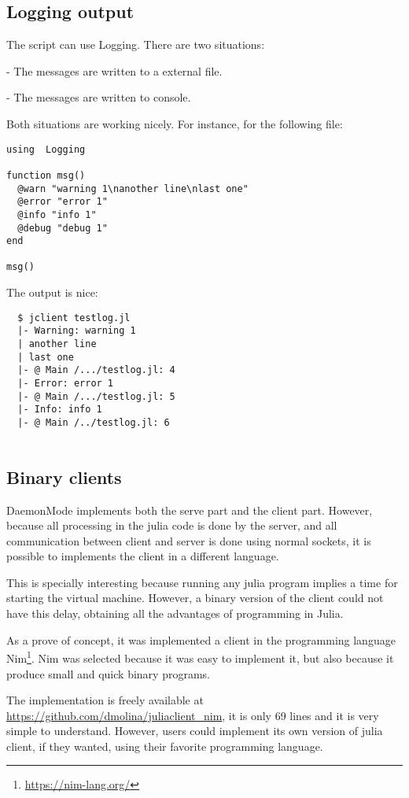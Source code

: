 \documentclass{juliacon}
\begin{document}
\subsection{Logging output}

The script can use Logging. There are two situations:

- The messages are written to a external file. 

- The messages are written to console. 

Both situations are working nicely. For instance, for the following  file:

\begin{lstlisting}
using  Logging

function msg()
  @warn "warning 1\nanother line\nlast one"
  @error "error 1"
  @info "info 1"
  @debug "debug 1"
end

msg()
\end{lstlisting}

The output is nice:
\begin{lstlisting}
  $ jclient testlog.jl
  |- Warning: warning 1
  | another line
  | last one
  |- @ Main /.../testlog.jl: 4
  |- Error: error 1
  |- @ Main /.../testlog.jl: 5
  |- Info: info 1
  |- @ Main /../testlog.jl: 6
  
\end{lstlisting}

\subsection{Binary clients}
\label{sec:jclient}

DaemonMode implements both the serve part and the client part. However, because
all processing in the julia code is done by the server, and all communication
between client and server is done using normal sockets, it is possible to
implements the client in a different language. 

This is specially interesting because running any julia program implies a time for
starting the virtual machine. However, a binary version of the client could not
have this delay, obtaining all the advantages of programming in Julia.

As a prove of concept, it was implemented a client in the programming language
Nim\footnote{\url{https://nim-lang.org/}}. Nim was selected because it was easy
to implement it, but also because it produce small and quick binary programs.

The implementation is freely available at
\url{https://github.com/dmolina/juliaclient_nim}, it is only 69 lines and it is
very simple to understand. However, users could implement its own version of
julia client, if they wanted, using their favorite programming language. 
\end{document}
